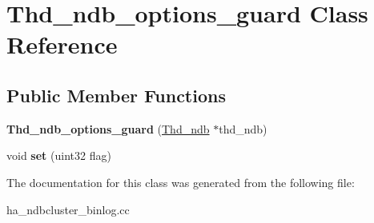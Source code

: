 \hypertarget{classThd__ndb__options__guard}{}\section{Thd\+\_\+ndb\+\_\+options\+\_\+guard Class Reference}
\label{classThd__ndb__options__guard}
\subsection*{Public Member Functions}
\begin{DoxyCompactItemize}
\item 
\mbox{\label{classThd__ndb__options__guard_a60c914378ba443b76b30e534c6a74028}} 
{\bfseries Thd\+\_\+ndb\+\_\+options\+\_\+guard} (\mbox{\hyperlink{classThd__ndb}{Thd\+\_\+ndb}} $\ast$thd\+\_\+ndb)
\item 
\mbox{\label{classThd__ndb__options__guard_a2bbe355f126faddbc73d7eedb3672a91}} 
void {\bfseries set} (uint32 flag)
\end{DoxyCompactItemize}


The documentation for this class was generated from the following file\+:\begin{DoxyCompactItemize}
\item 
ha\+\_\+ndbcluster\+\_\+binlog.\+cc\end{DoxyCompactItemize}
